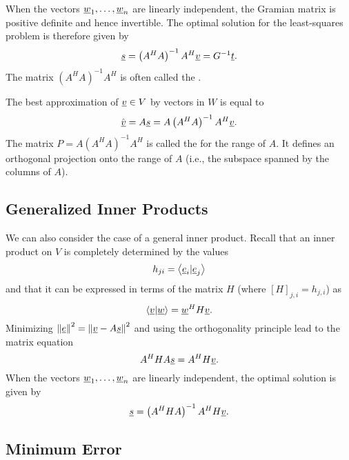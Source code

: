 When the vectors $\underline{w}_1, \ldots, \underline{w}_n$ are linearly independent, the Gramian matrix is positive definite and hence invertible.
The optimal solution for the least-squares problem is therefore given by
\begin{equation*}
\underline{s} = \left( A^H A \right)^{-1} A^H \underline{v} = G^{-1} \underline{t} .
\end{equation*}
The matrix $\left( A^H A \right)^{-1} A^H$ is often called the .

The best approximation of $\underline{v} \in V$ by vectors in $W$ is equal to
\begin{equation*}
\hat{\underline{v}} = A \underline{s} = A \left( A^H A \right)^{-1} A^H \underline{v} .
\end{equation*}
The matrix $P = A \left( A^H A \right)^{-1} A^H$ is called the  for the range of $A$.
It defines an orthogonal projection onto the range of $A$ (i.e., the subspace spanned by the columns of $A$).


\subsection{Generalized Inner Products}

We can also consider the case of a general inner product.
Recall that an inner product on $V$ is completely determined by the values
\begin{equation*}
h_{ji} = \left\langle \underline{e}_i | \underline{e}_j \right\rangle
\end{equation*}
and that it can be expressed in terms of the matrix $H$ (where $[H]_{j,i} = h_{j,i}$) as
\begin{equation*}
\left\langle \underline{v} | \underline{w} \right\rangle
= \underline{w}^H H \underline{v}.
\end{equation*}
Minimizing $\left\| \underline{e} \right\|^2 = \left\| \underline{v} - A \underline{s} \right\|^2$ and using the orthogonality principle lead to the matrix equation
\begin{equation*}
A^H H A \underline{s} = A^H H \underline{v}.
\end{equation*}
When the vectors $\underline{w}_1, \ldots, \underline{w}_n$ are linearly independent, the optimal solution is given by
\begin{equation*}
\underline{s} = \left( A^H H A \right)^{-1} A^H H \underline{v}.
\end{equation*}


\subsection{Minimum Error}


